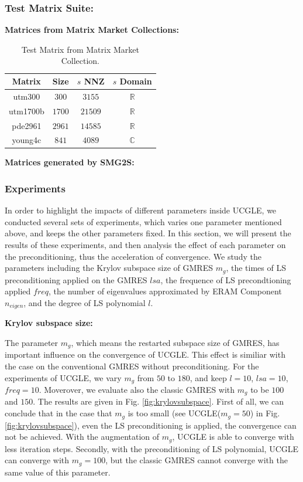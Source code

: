 \subsubsection{Test Matrix Suite: }

\textbf{Matrices from Matrix Market Collections: }
\begin{table}[htbp]
	\renewcommand{\arraystretch}{1.4}
	\small	
	\caption{Test Matrix from Matrix Market Collection.}
	\label{testmatrixforparameters}
	\centering
	\begin{tabular}{c|c|c|c}
		\toprule
		Matrix  & Size & $s$ NNZ & $s$ Domain\\
		\midrule
		utm300  & $300$ & $3155$ &$\mathbb{R}$ \\
		utm1700b & $1700$ & $21509$  & $\mathbb{R}$ \\
		pde2961 & $2961$ & $14585$& $\mathbb{R}$ \\
		young4c & $841$ & $4089$& $\mathbb{C}$ \\
		\bottomrule
	\end{tabular}
\end{table}

\textbf{Matrices generated by SMG2S: }

\subsubsection{Experiments}

In order to highlight the impacts of different parameters inside UCGLE, we conducted several sets of experiments, which varies one parameter mentioned above, and keeps the other parameters fixed. In this section, we will present the results of these experiments, and then analysis the effect of each parameter on the preconditioning, thus the acceleration of convergence. We study the parameters including the Krylov subspace size of GMRES $m_g$, the times of LS preconditioning applied on the GMRES $lsa$, the frequence of LS precondtioning applied $freq$, the number of eigenvalues approximated by ERAM Component $n_{eigen}$, and the degree of LS polynomial $l$.

\textbf{Krylov subspace size: }

The parameter $m_g$, which means the restarted subspace size of GMRES, has important influence on the convergence of UCGLE.  This effect is similiar with the case on the conventional GMRES without preconditioning. For the experiments of UCGLE, we vary $m_g$ from $50$ to $180$, and keep $l=10$, $lsa=10$, $freq=10$. Moverover, we evaluate also the classic GMRES with $m_g$ to be $100$ and $150$. The results are given in Fig. \ref{fig:krylovsubspace}. First of all, we can conclude that in the case that $m_g$ is too small (see UCGLE($m_g=50$) in  Fig. \ref{fig:krylovsubspace}), even the LS preconditioning is applied, the convergence can not be achieved. With the augmentation of $m_g$, UCGLE is able to converge with less iteration steps. Secondly, with the preconditioning of LS polynomial, UCGLE can converge with $m_g=100$, but the classic GMRES cannot converge with the same value of this parameter.

